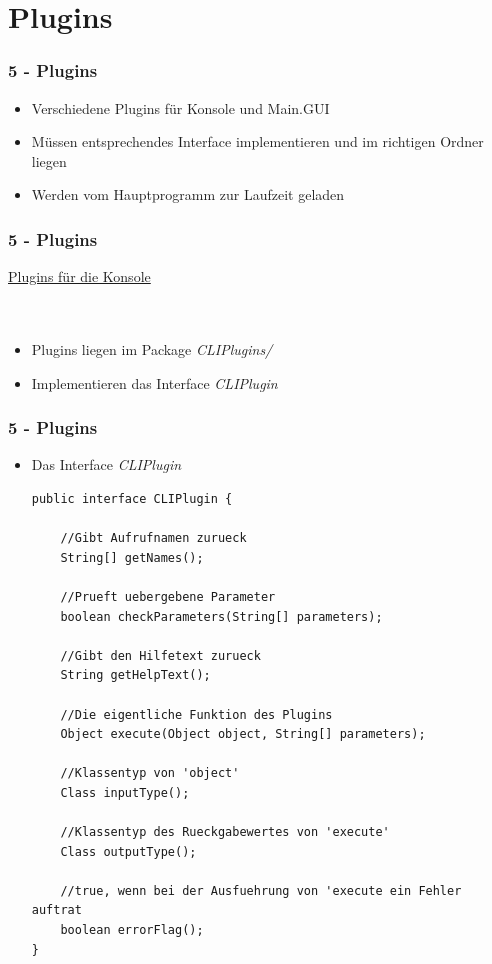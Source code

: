 \documentclass[9pt, xcolor={dvipsnames}]{beamer}
\begin{document}

\section{Plugins}
\begin{frame}\frametitle{5 - Plugins}
	\begin{itemize}
		\item Verschiedene Plugins für Konsole und Main.GUI
		\item Müssen entsprechendes Interface implementieren und im richtigen Ordner liegen
		\item Werden vom Hauptprogramm zur Laufzeit geladen
	\end{itemize}
\end{frame}

\begin{frame}\frametitle{5 - Plugins}
	{ \fontsize{20}{20} \selectfont \underline{Plugins für die Konsole}}
	\ \\
	\ \\
	\ \\
	\pause
	\begin{itemize}
		\item Plugins liegen im Package \textit{CLIPlugins/}
		\item Implementieren das Interface \textit{CLIPlugin}
	\end{itemize}
\end{frame}

\begin{frame}[fragile]\frametitle{5 - Plugins}
	\begin{itemize}
		\item[] Das Interface \textit{CLIPlugin}
		\pause
		\begin{lstlisting}[frame=single, basicstyle=\tiny]
public interface CLIPlugin {

	//Gibt Aufrufnamen zurueck
	String[] getNames();
	
	//Prueft uebergebene Parameter
	boolean checkParameters(String[] parameters);
	
	//Gibt den Hilfetext zurueck
	String getHelpText();
	
	//Die eigentliche Funktion des Plugins
	Object execute(Object object, String[] parameters);
	
	//Klassentyp von 'object'
	Class inputType();
	
	//Klassentyp des Rueckgabewertes von 'execute'
	Class outputType();
	
	//true, wenn bei der Ausfuehrung von 'execute ein Fehler auftrat
	boolean errorFlag();
}
		\end{lstlisting}
	\end{itemize}
\end{frame}
\end{document}
